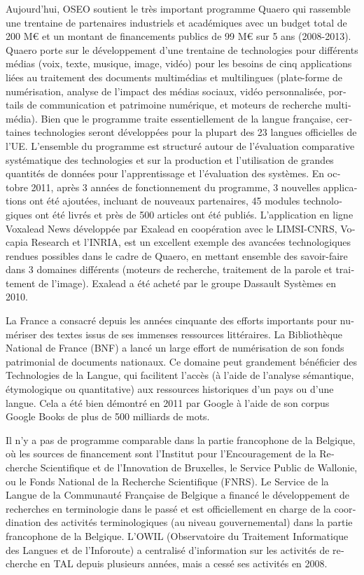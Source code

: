 \begin{french}
\begin{multicols}{2}
Aujourd'hui, OSEO soutient le très important programme Quaero qui
rassemble une trentaine de partenaires industriels et académiques avec
un budget total de 200 M€ et un montant de financements publics de 99
M€ sur 5 ans (2008-2013). Quaero porte sur le développement d'une
trentaine de technologies pour différents médias (voix, texte,
musique, image, vidéo) pour les besoins de cinq applications liées au
traitement des documents multimédias et multilingues (plate-forme de
numérisation, analyse de l'impact des médias sociaux, vidéo
personnalisée, portails de communication et patrimoine numérique, et
moteurs de recherche multimédia). Bien que le programme traite
essentiellement de la langue française, certaines technologies seront
développées pour la plupart des 23 langues officielles de
l'UE. L'ensemble du programme est structuré autour de l'évaluation
comparative systématique des technologies et sur la production et
l'utilisation de grandes quantités de données pour l'apprentissage et
l'évaluation des systèmes. En octobre 2011, après 3 années de
fonctionnement du programme, 3 nouvelles applications ont été
ajoutées, incluant de nouveaux partenaires, 45 modules technologiques
ont été livrés et près de 500 articles ont été publiés. L'application
en ligne Voxalead News développée par Exalead en coopération avec le
LIMSI-CNRS, Vocapia Research et l'INRIA, est un excellent exemple des
avancées technologiques rendues possibles dans le cadre de Quaero, en
mettant ensemble des savoir-faire dans 3 domaines différents (moteurs
de recherche, traitement de la parole et traitement de
l'image). Exalead a été acheté par le groupe Dassault Systèmes en 2010.

La France a consacré depuis les années cinquante des efforts
importants pour numériser des textes issus de ses immenses ressources
littéraires. La Bibliothèque National de France (BNF) a lancé un large
effort de numérisation de son fonds patrimonial de documents
nationaux. Ce domaine peut grandement bénéficier des Technologies de
la Langue, qui facilitent l'accès (à l'aide de l'analyse sémantique,
étymologique ou quantitative) aux ressources historiques d'un pays ou
d'une langue. Cela a été bien démontré en 2011 par Google à l'aide de
son corpus Google Books de plus de 500 milliards de mots.

Il n'y a pas de programme comparable dans la partie francophone de la
Belgique, où les sources de financement sont l'Institut pour
l'Encouragement de la Recherche Scientifique et de l'Innovation de
Bruxelles, le Service Public de Wallonie, ou le Fonds National de la
Recherche Scientifique (FNRS). Le Service de la Langue de la
Communauté Française de Belgique a financé le développement de
recherches en terminologie dans le passé et est officiellement en
charge de la coordination des activités terminologiques (au niveau
gouvernemental) dans la partie francophone de la Belgique. L'OWIL
(Observatoire du Traitement Informatique des Langues et de
l'Inforoute) a centralisé d'information sur les activités de recherche
en TAL depuis plusieurs années, mais a cessé ses activités en 2008.


\end{multicols}
\end{french}
